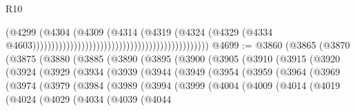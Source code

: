 \begin{lexlean}{R10}
\begin{coremodule}
                                                                                  (@4299
                                                                                    (@4304
                                                                                      (@4309
                                                                                        (@4314
                                                                                          (@4319
                                                                                            (@4324
                                                                                              (@4329
                                                                                                (@4334
                                                                                                  @4603)))))))))))))))))))))))))))))))))))))))))))))))
@4699 := @3860
    (@3865
      (@3870
        (@3875
          (@3880
            (@3885
              (@3890
                (@3895
                  (@3900
                    (@3905
                      (@3910
                        (@3915
                          (@3920
                            (@3924
                              (@3929
                                (@3934
                                  (@3939
                                    (@3944
                                      (@3949
                                        (@3954
                                          (@3959
                                            (@3964
                                              (@3969
                                                (@3974
                                                  (@3979
                                                    (@3984
                                                      (@3989
                                                        (@3994
                                                          (@3999
                                                            (@4004
                                                              (@4009
                                                                (@4014
                                                                  (@4019
                                                                    (@4024
                                                                      (@4029
                                                                        (@4034
                                                                          (@4039
                                                                            (@4044

\end{coremodule}
\end{lexlean}
